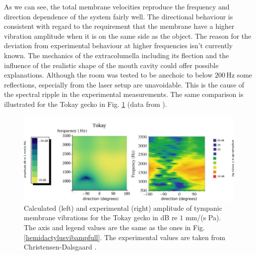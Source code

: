 As we can see, the total membrane velocities reproduce the frequency and direction dependence of the system fairly well. The directional behaviour is consistent with regard
to the requirement that the membrane have a higher vibration amplitude when it is on the same side as the object. The reason for the deviation from experimental behaviour at 
higher frequencies isn't currently known. The mechanics of the extracolumella including its flection and the influence of the realistic shape of the mouth cavity could offer possible explanations.
Although the room was tested to be anechoic to below $200\,$Hz some reflections, especially from
the laser setup are unavoidable. This is the cause of the spectral ripple in the experimental measurements. The same comparison is illustrated for the Tokay gecko in Fig. \ref{tokayvibampfull} (data from \cite{dalsgaardmanley1}).
\begin{figure}[ht!]
 \centering
 \includegraphics[width=1.0\linewidth]{Diagrams/Plots/tokayvibampfull.png}
 \caption[Vibration amplitude for the Tokay gecko]{Calculated (left) and experimental (right) amplitude of tympanic membrane vibrations for the Tokay gecko
 in dB re $1$ mm/(s Pa). The axis and legend values are the same as the ones in Fig. \ref{hemidactylusvibampfull}. The experimental values are taken from Christensen-Dalsgaard \cite{dalsgaardmanley1}.}
  \label{tokayvibampfull}
\end{figure}


